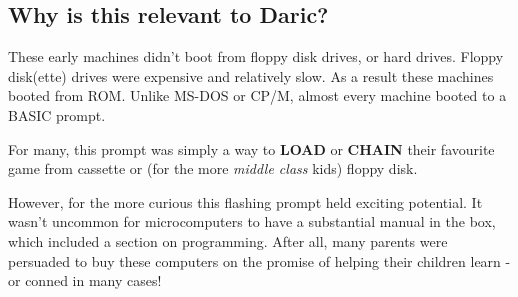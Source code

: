 \documentclass[10pt]{book}
\newcommand{\Daric}{Daric}
\begin{document}
\subsection{Why is this relevant to \Daric?}
\par{These early machines didn't boot from floppy disk drives, or hard drives. Floppy disk(ette) drives were expensive and relatively slow. As a result these machines booted from ROM. Unlike MS-DOS or CP/M, almost every machine booted to a BASIC prompt.}
\par{For many, this prompt was simply a way to \textbf{LOAD} or \textbf{CHAIN} their favourite game from cassette or (for the more \emph{middle class} kids) floppy disk.}
\par{However, for the more curious this flashing prompt held exciting potential. It wasn't uncommon for microcomputers to have a substantial manual in the box, which included a section on programming. After all, many parents were persuaded to buy these computers on the promise of helping their children learn - or conned in many cases!}
\end{document}
